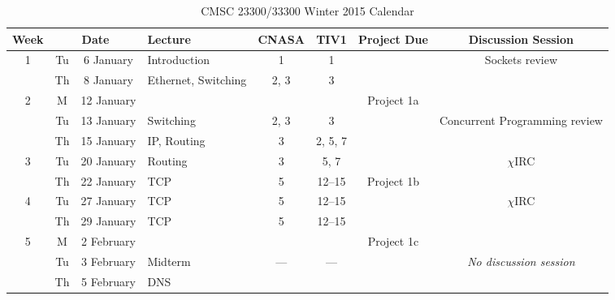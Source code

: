 \documentclass[11pt]{article}
\newcommand{\chirc}{$\chi$\textsf{IRC}}
\begin{document}
\begin{sidewaystable}
\sffamily\small
\setlength{\extrarowheight}{4pt}
\caption{CMSC 23300/33300 Winter 2015 Calendar}
\begin{tabular}{|c|cc||p{6cm}|c|c|c|c|}
\hline
\textbf{Week} &  \multicolumn{2}{|c||}{\textbf{Date}} & \textbf{Lecture} & \textbf{CNASA} & \textbf{TIV1} & \textbf{Project Due} & \textbf{Discussion Session} \\\hline

\multirow{2}{*}{1}  & Tu & 6 January    & Introduction                                    & 1    & 1       & \cellcolor[gray]{0.9}  & Sockets review \\\cline{2-6}
                    & Th & 8 January    & Ethernet, Switching                             & 2, 3 & 3       & \cellcolor[gray]{0.9}  & \cellcolor[gray]{0.9} \\\hline\hline

\multirow{3}{*}{2}  & M  & 12 January   & \cellcolor[gray]{0.9}  & \cellcolor[gray]{0.9}   & \cellcolor[gray]{0.9}  & Project 1a  & \cellcolor[gray]{0.9} \\\cline{2-6}
                    & Tu & 13 January   & Switching                                       & 2, 3 & 3       & \cellcolor[gray]{0.9}  & Concurrent Programming review\\\cline{2-6}
                    & Th & 15 January   & IP, Routing                                     & 3    & 2, 5, 7  & \cellcolor[gray]{0.9}  & \cellcolor[gray]{0.9} \\\hline\hline

\multirow{2}{*}{3}  & Tu & 20 January   & Routing                                         & 3    & 5, 7    & \cellcolor[gray]{0.9}  & \chirc \\\cline{2-6}
                    & Th & 22 January   & TCP                                             & 5    & 12--15  & Project 1b  & \cellcolor[gray]{0.9} \\\hline\hline

\multirow{2}{*}{4}  & Tu & 27 January   & TCP                                             & 5    & 12--15  & \cellcolor[gray]{0.9}  & \chirc \\\cline{2-6}
                    & Th & 29 January   & TCP                                             & 5    & 12--15  & \cellcolor[gray]{0.9}  & \cellcolor[gray]{0.9} \\\hline\hline

\multirow{3}{*}{5}  & M  & 2 February   & \cellcolor[gray]{0.9}  & \cellcolor[gray]{0.9}   & \cellcolor[gray]{0.9}  & Project 1c  & \cellcolor[gray]{0.9} \\\cline{2-6}
                    & Tu & 3 February   & Midterm                                         & ---    & ---  & \cellcolor[gray]{0.9}  & \emph{No discussion session} \\\cline{2-6}
                    & Th & 5 February   & DNS                                             &     &   & \cellcolor[gray]{0.9}  & \cellcolor[gray]{0.9} \\\hline\hline


\end{tabular}
\end{sidewaystable}
\end{document}
